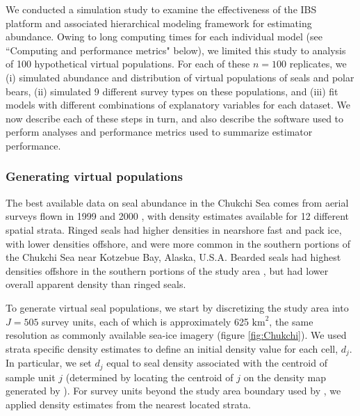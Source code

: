 \documentclass[]{rsos}%
\begin{document}
{We conducted a simulation study to examine the effectiveness of the IBS platform and associated hierarchical modeling framework for estimating abundance.  Owing to long computing times for each individual model (see ``Computing and performance metrics" below), we limited this study to analysis of 100 hypothetical virtual populations.  For each of these $n=100$ replicates, we (i) simulated abundance and distribution of virtual populations of seals and polar bears, (ii) simulated 9 different survey types on these populations, and (iii) fit models with different combinations of explanatory variables for each dataset.  We now describe each of these steps in turn, and also describe the software used to perform analyses and performance metrics used to summarize estimator performance.

\subsubsection{Generating virtual populations}

The best available data on seal abundance in the Chukchi Sea comes from aerial surveys flown in 1999 and 2000 \cite{Bengtson2005}, with density estimates available for 12 different spatial strata. Ringed seals had higher densities in nearshore fast and pack ice, with lower densities offshore, and were more common in the southern portions of the Chukchi Sea near Kotzebue Bay, Alaska, U.S.A.  Bearded seals had highest densities offshore in the southern portions of the study area \cite{Bengtson2005}, but had lower overall apparent density than ringed seals.

To generate virtual seal populations, we start by discretizing the study area into $J=505$ survey units, each of which is approximately 625 $\text{km}^2$, the same resolution as commonly available sea-ice imagery (figure \ref{fig:Chukchi}). We used strata specific density estimates to define an initial density value for each cell, $d_j$. In particular, we set $d_j$ equal to seal density associated with the centroid of sample unit $j$ (determined by locating the centroid of $j$ on the density map generated by \cite{Bengtson2005}).  For survey units beyond the study area boundary used by \cite{Bengtson2005}, we applied density estimates from the nearest located strata.

}
\end{document}
